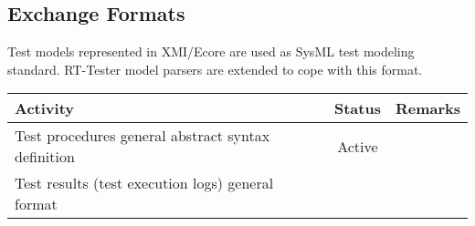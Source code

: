 \documentclass[11pt, a4paper]{article}
\begin{document}
\subsection{Exchange Formats}
Test models represented in XMI/Ecore are used as SysML test modeling
standard. RT-Tester model parsers are extended to cope with this
format.

\begin{tabular}{p{}cp{}}\toprule
Activity & Status & Remarks \\\midrule
Test procedures general abstract syntax definition &Active&\\\midrule
Test results (test execution logs) general format &&\\
\bottomrule
\end{tabular}


 
\end{document}
